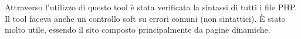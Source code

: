 Attraverso l’utilizzo di questo tool è stata verificata la sintassi di tutti i file PHP. Il tool faceva anche un controllo soft su errori comuni (non sintattici). È stato molto utile, essendo il sito composto principalmente da pagine dinamiche.